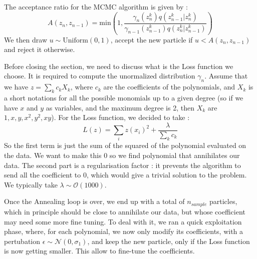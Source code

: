 \documentclass[11pt]{article}
\newcommand{\bd}[1]{\marginpar{\parbox{\marginparwidth}{\boldmath $\Longleftarrow$}}{\boldmath\bfseries (bd: #1)}}
\begin{document}
		
		The acceptance ratio for the MCMC algorithm is given by : 
		\begin{equation}
			A(z_n,z_{n-1}) = \mathrm{min} \left(1,\frac{ \gamma_n(z_n^k) q(z_{n-1}^k | z_n^k) }{ \gamma_{n-1}(z_{n-1}^k) q(z_n^k | z_{n-1}^k) }  \right)
		\end{equation}
		We then draw $u\sim \mathrm{Uniform}(0,1)$, accept the new particle if $u<A(z_n,z_{n-1})$ and reject it otherwise.
		
		Before closing the section, we need to discuss what is the Loss function we choose. It is required to compute the unormalized distribution $\gamma_n$. Assume that we have $z = \sum_k c_k X_k$, where $c_k$ are the coefficients of the polynomials, and $X_k$ is a short notations for all the possible monomials up to a given degree (so if we have $x$ and $y$ as variables, and the maximum degree is 2, then $X_k$ are $1, x, y, x^2, y^2, x y$). For the Loss function, we decided to take : 
		\begin{equation}
			L(z) = \sum_{i} z(x_i)^2 + \frac{\lambda}{\sum_k c_k}
		\end{equation}
		So the first term is just the sum of the squared of the polynomial evaluated on the data. We want to make this 0 so we find polynomial that annihilates our data. The second part is a regularisation factor : it prevents the algorithm to send all the coefficient to 0, which would give a trivial solution to the problem. We typically take $\lambda \sim \mathcal{O}(1000)$.
		
		
		Once the Annealing loop is over, we end up with a total of $n_{sample}$ particles, which in principle should be close to annihilate our data, but whose coefficient may need some more fine tuning. To deal with it, we ran a quick exploitation phase, where, for each polynomial, we now only modify its coefficients, with a pertubation $\epsilon \sim \mathcal{N}(0, \sigma_1)$, and keep the new particle, only if the Loss function is now getting smaller. This allow to fine-tune the coefficients. 

	
\end{document}
